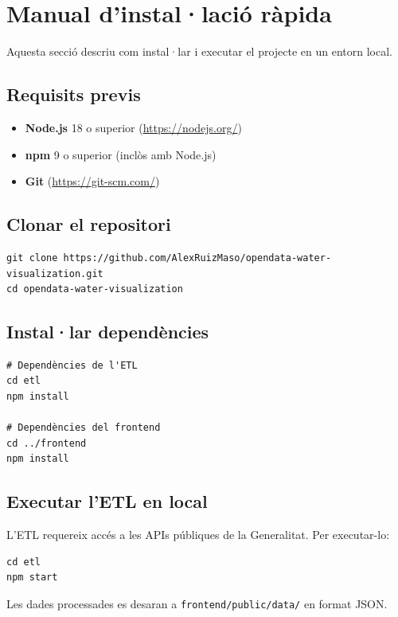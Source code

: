 \section{Manual d'instal·lació ràpida}

Aquesta secció descriu com instal·lar i executar el projecte en un entorn local.

\subsection{Requisits previs}

\begin{itemize}
    \item \textbf{Node.js} 18 o superior (\url{https://nodejs.org/})
    \item \textbf{npm} 9 o superior (inclòs amb Node.js)
    \item \textbf{Git} (\url{https://git-scm.com/})
\end{itemize}

\subsection{Clonar el repositori}

\begin{verbatim}
git clone https://github.com/AlexRuizMaso/opendata-water-visualization.git
cd opendata-water-visualization
\end{verbatim}

\subsection{Instal·lar dependències}

\begin{verbatim}
# Dependències de l'ETL
cd etl
npm install

# Dependències del frontend
cd ../frontend
npm install
\end{verbatim}

\subsection{Executar l'ETL en local}

L'ETL requereix accés a les APIs públiques de la Generalitat. Per executar-lo:

\begin{verbatim}
cd etl
npm start
\end{verbatim}

Les dades processades es desaran a \texttt{frontend/public/data/} en format JSON.

